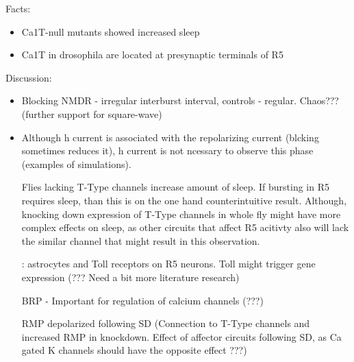 \documentclass[../main.tex]{subfiles}
\begin{document}
\noindent\hrulefill

\color{orange}

Facts:
\begin{itemize}
    \item Ca1T-null mutants showed increased sleep \parencite{jeongCaa1TFlyTtype2015}
    \item Ca1T in drosophila are located at presynaptic terminals of R5
    
\end{itemize}

\color{red}

Discussion:
\begin{itemize}
    \item Blocking NMDR - irregular interburst interval, controls - regular.
    Chaos??? (further support for square-wave)
    \parencite{raccugliaNetworkSpecificSynchronizationElectrical2019,izhikevichNEURALEXCITABILITYSPIKING2000}
    
    \item Although h current is associated with the repolarizing current (blcking sometimes reduces it),
    h current is not ncessary to observe this phase (examples of simulations).

    \parencite{jeongCaa1TFlyTtype2015} Flies lacking T-Type channels increase amount of sleep. If bursting in
    R5 requires sleep, than this is on the one hand counterintuitive result. Although, knocking down
    expression of T-Type channels in whole fly might have more complex effects on sleep, as other
    circuits that affect R5 acitivty also will lack the similar channel that might result in this
    observation.

    \parencite{blumAstroglialCalciumSignaling2021}: astrocytes and Toll receptors on R5 neurons.
    Toll might trigger gene expression (??? Need a bit more literature research)

    BRP - Important for regulation of calcium channels (???)

    RMP depolarized following SD (Connection to T-Type channels and increased RMP in knockdown.
    Effect of affector circuits following SD, as Ca gated K channels should have the opposite effect ???)
    \parencite{liuSleepDriveEncoded2016}


\end{itemize}
\end{document}
